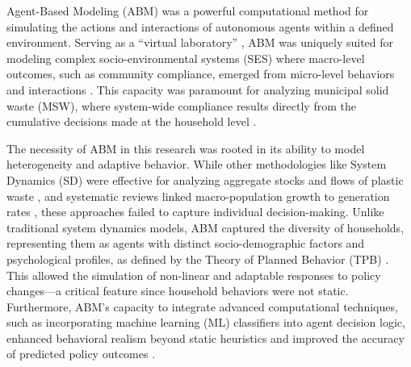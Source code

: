 Agent-Based Modeling (ABM) was a powerful computational method for simulating the actions and interactions of autonomous agents within a defined environment. Serving as a ``virtual laboratory'' \citep{deSouza2021}, ABM was uniquely suited for modeling complex socio-environmental systems (SES) where macro-level outcomes, such as community compliance, emerged from micro-level behaviors and interactions \citep{Brugiere2022}. This capacity was paramount for analyzing municipal solid waste (MSW), where system-wide compliance results directly from the cumulative decisions made at the household level \citep{Fontaine2024}.

The necessity of ABM in this research was rooted in its ability to model heterogeneity and adaptive behavior. While other methodologies like System Dynamics (SD) were effective for analyzing aggregate stocks and flows of plastic waste \citep{Dhanshyam2021}, and systematic reviews linked macro-population growth to generation rates \citep{Eltanal2025}, these approaches failed to capture individual decision-making. Unlike traditional system dynamics models, ABM captured the diversity of households, representing them as agents with distinct socio-demographic factors and psychological profiles, as defined by the Theory of Planned Behavior (TPB) \citep{Fontaine2024}. This allowed the simulation of non-linear and adaptable responses to policy changes---a critical feature since household behaviors were not static. Furthermore, ABM's capacity to integrate advanced computational techniques, such as incorporating machine learning (ML) classifiers into agent decision logic, enhanced behavioral realism beyond static heuristics and improved the accuracy of predicted policy outcomes \citep{Jimenez2025}.
